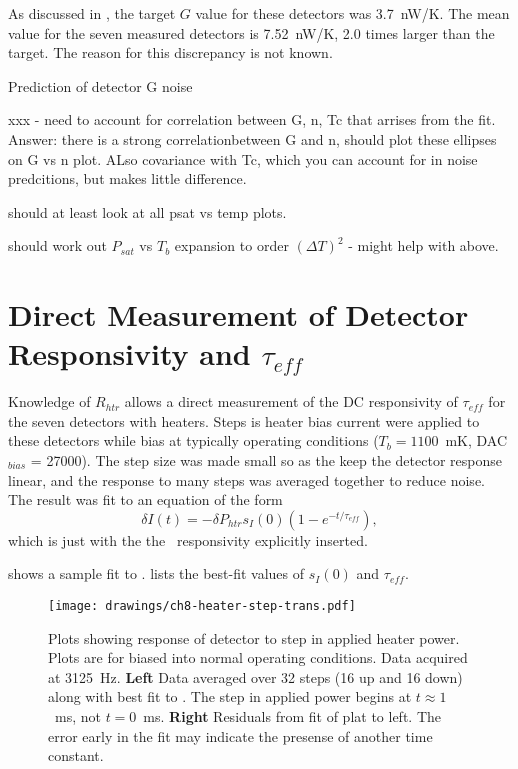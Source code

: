 As discussed in , the target $G$ value for these detectors was 3.7~nW/K.
The mean value for the seven measured detectors is 7.52~nW/K, 2.0 times larger than the target.
The reason for this discrepancy is not known.

Prediction of detector G noise

xxx - need to account for correlation between G, n, Tc that arrises from the fit.
Answer: there is a strong correlationbetween G and n, should plot these ellipses on G vs n plot. ALso covariance with Tc, which you can account for in noise predcitions, but makes little difference.

should at least look at all psat vs temp plots.

should work out $P_{sat}$ vs $T_b$ expansion to order $(\Delta T)^2$ - might help with above.

\section{Direct Measurement of Detector Responsivity and $\tau_{eff}$}

Knowledge of $R_{htr}$ allows a direct measurement of the DC responsivity of $\tau_{eff}$ for the seven detectors with heaters.
Steps is heater bias current were applied to these detectors while bias at typically operating conditions ($T_b = 1100$~mK, DAC$_{bias}$ = 27000).
The step size was made small so as the keep the detector response linear, and the response to many steps was averaged together to reduce noise.
The result was fit to an equation of the form
\begin{equation} \label{eqn:ch8-heater-step-trans}
  \delta I(t) = - \delta P_{htr} s_I(0) (1 - e^{-t/\tau_{eff}}),
\end{equation}
which is just  with the the \DC\ responsivity explicitly inserted.

 shows a sample fit to .
 lists the best-fit values of $s_I(0)$ and $\tau_{eff}$.

\begin{figure*}
\texttt{[image: drawings/ch8-heater-step-trans.pdf]}
\caption{Plots showing response of detector to step in applied heater power. Plots are for  biased into normal operating conditions. Data acquired at 3125~Hz.
\textbf{Left} Data averaged over 32 steps (16 up and 16 down) along with best fit to .
The step in applied power begins at $t \approx 1$~ms, not $t = 0$~ms.
\textbf{Right} Residuals from fit of plat to left. The error early in the fit may indicate the presense of another time constant.
} 
\label{fig:ch8-heater-step-trans}
\end{figure*}

